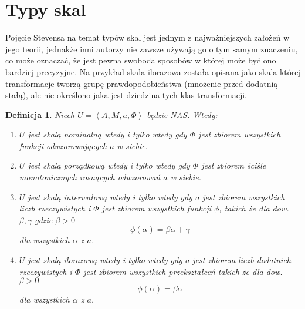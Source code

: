 \documentclass[12pt,a4paper]{report}
\newtheorem{definition}{Definicja}
\newcommand{\tuple}[1]{\left\langle {#1} \right\rangle}
\begin{document}
\section{Typy skal}
Pojęcie Stevensa na temat typów skal jest jednym z najważniejszych założeń w jego teorii, jednakże inni autorzy nie zawsze używają go o tym samym znaczeniu, co może oznaczać, że jest pewna swoboda sposobów w której może być ono bardziej precyzyjne. Na przykład skala ilorazowa została opisana jako skala której transformacje tworzą grupę prawdopodobieństwa (mnożenie przed dodatnią stałą), ale nie określono jaka jest dziedzina tych klas transformacji.  
\begin{definition}
Niech $U=\tuple{A, M, a, \Phi}$ będzie NAS. Wtedy:
\begin{enumerate}
\item
$U$ jest skalą nominalną wtedy i tylko wtedy gdy $\Phi$ jest zbiorem wszystkich funkcji odwzorowujących $a$ w siebie.
\item
$U$ jest skalą porządkową wtedy i tylko wtedy gdy $\Phi$ jest zbiorem ściśle monotonicznych rosnących odwzorowań $a$ w siebie.
\item
$U$ jest skalą interwałową wtedy i tylko wtedy gdy $a$ jest zbiorem wszystkich liczb rzeczywistych i $\Phi$ jest zbiorem wszystkich funkcji $\phi$, takich że dla dow. $\beta,\gamma$ gdzie $\beta>0$
\begin{equation*}
\phi(\alpha)=\beta\alpha+\gamma
\end{equation*}
dla wszystkich $\alpha$ z $a$.
\item
$U$ jest skalą ilorazową wtedy i tylko wtedy gdy $a$ jest zbiorem liczb dodatnich rzeczywistych i $\Phi$ jest zbiorem wszystkich przekształceń takich że dla dow. $\beta>0$
\begin{equation*}
\phi(\alpha)=\beta\alpha
\end{equation*}
dla wszystkich $\alpha$ z $a$.
\end{enumerate}
\end{definition}
\end{document}
